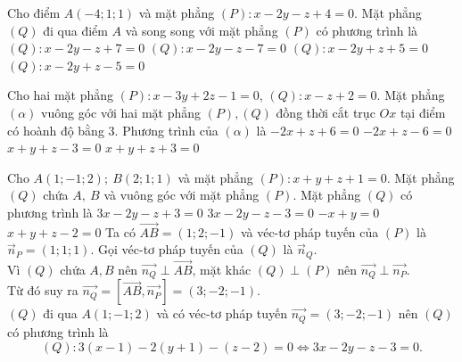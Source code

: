 \begin{ex}%
	Cho điểm $A(-4;1;1)$ và mặt phẳng $(P)\colon x-2y-z+4=0$. Mặt phẳng $(Q)$ đi qua điểm $A$ và song song với mặt phẳng $(P)$ có phương trình là
	\choice
	{\True $(Q)\colon x-2y-z+7=0$}
	{$(Q)\colon x-2y-z-7=0$}
	{$(Q)\colon x-2y+z+5=0$}
	{$(Q)\colon x-2y+z-5=0$}
\end{ex}
\begin{ex}%
	Cho hai mặt phẳng $(P)\colon x-3y+2z-1=0$, $(Q)\colon x-z+2=0$. Mặt phẳng $\left(\alpha\right)$ vuông góc với hai mặt phẳng $(P),(Q)$ đồng thời cắt trục $Ox$ tại điểm có hoành độ bằng $3$. Phương trình của $\left(\alpha\right)$ là
	\choice
	{$-2x+z+6=0$}
	{$-2x+z-6=0$}
	{\True $x+y+z-3=0$}
	{$x+y+z+3=0$}
\end{ex}
\begin{ex}%
	Cho $A\left( 1;-1;2 \right);\ B\left( 2;1;1 \right)$ và mặt phẳng $\left( P \right):x+y+z+1=0$. Mặt phẳng $\left( Q \right)$ chứa $A,\ B$ và vuông góc với mặt phẳng $\left( P \right)$. Mặt phẳng $\left( Q \right)$ có phương trình là
	\choice
	{$3x-2y-z+3=0$}
	{\True $3x-2y-z-3=0$}
	{$-x+y=0$}
	{$x+y+z-2=0$}
	\loigiai
	{
		Ta có $\vec{A B}=(1 ; 2 ;-1)$ và véc-tơ pháp tuyến của $(P)$ là $\vec{n}_{P}=(1 ; 1 ; 1)$. Gọi véc-tơ pháp tuyến của $(Q)$ là $\vec{n}_{Q}$.\\
		Vì $(Q)$ chứa $A,B$ nên $\vec{n_{Q}} \perp \vec{A B}$, mặt khác $(Q) \perp(P)$ nên $\vec{n_{Q}} \perp \vec{n_{P}}$. \\
		Từ đó suy ra $\vec{n_{Q}}=\left[\vec{A B}, \vec{n_{P}}\right]=(3 ;-2 ;-1)$.\\
		$(Q)$ đi qua $A(1;-1;2)$ và có véc-tơ pháp tuyến $\vec{n_{Q}}=(3 ;-2 ;-1)$ nên $(Q)$ có phương trình là
		$$(Q):3(x-1)-2(y+1)-(z-2)=0 \Leftrightarrow 3 x-2 y-z-3=0.$$
	}
\end{ex}
